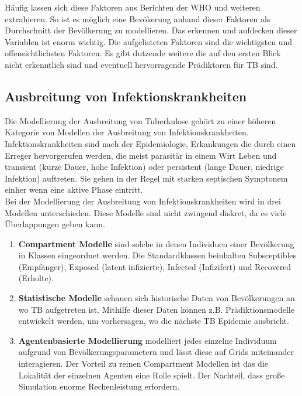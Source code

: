\documentclass[paper=a4, fontsize=11pt, ngerman, abstract=on]{scrartcl}
\numberwithin{equation}{section} %
\numberwithin{figure}{section} %
\numberwithin{table}{section} %
\begin{document}
Häufig lassen sich diese Faktoren aus Berichten der WHO und weiteren extrahieren. So ist es möglich eine Bevökerung anhand dieser Faktoren als Durchschnitt der Bevölkerung zu modellieren. Das erkennen und aufdecken dieser Variablen ist enorm wichtig. Die aufgelisteten Faktoren sind die wichtigsten und offensichtlichsten Faktoren. Es gibt dutzende weitere die auf den ersten Blick nicht erkenntlich sind und eventuell hervorragende Prädiktoren für TB sind. \cite{WHOTB2016}

\subsection{Ausbreitung von Infektionskrankheiten}

Die Modellierung der Ausbreitung von Tuberkulose gehört zu einer höheren Kategorie von Modellen der Ausbreitung von Infektionskrankheiten. Infektionskrankheiten sind nach der Epidemiologie, Erkankungen die durch einen Erreger hervorgerufen werden, die meist parasitär in einem Wirt Leben und transient (kurze Dauer, hohe Infektion) oder persistent (lange Dauer, niedrige Infektion) auftreten. Sie gehen in der Regel mit starken septischen Symptonem einher wenn eine aktive Phase eintritt. \\

Bei der Modellierung der Ausbreitung von Infektionskrankheiten wird in drei Modellen unterschieden. Diese Modelle sind nicht zwingend diskret, da es viele Überlappungen geben kann.

\begin{enumerate}
  \item{\textbf{Compartment Modelle} sind solche in denen Individuen einer Bevölkerung in Klassen eingeordnet werden. Die Standardklassen beinhalten Subsceptibles (Empfänger), Exposed (latent infizierte), Infected (Infizifert) und Recovered (Erholte).}
  \item{\textbf{Statistische Modelle} schauen sich historische Daten von Bevölkerungen an wo TB aufgetreten ist. Mithilfe dieser Daten können z.B. Prädiktionsmodelle entwickelt werden, um vorhersagen, wo die nächste TB Epidemie ausbricht.}
  \item{\textbf{Agentenbasierte Modellierung} modelliert jedes einzelne Individuum aufgrund von Bevölkerungsparametern und lässt diese auf Grids miteinander interagieren. Der Vorteil zu reinen Compartment Modellen ist das die Lokalität der einzelnen Agenten eine Rolle spielt. Der Nachteil, dass große Simulation enorme Rechenleistung erfordern.}
\end{enumerate}
\end{document}
